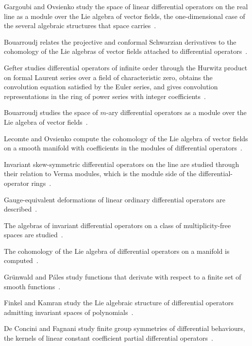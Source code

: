 Gargoubi and Ovsienko study the space of linear differential operators on the real line as a module over the Lie algebra of vector fields, the one-dimensional case of the several algebraic structures that space carries~\cite{WlSpaceOfLinearDifferentialOpera1996}.

Bouarroudj relates the projective and conformal Schwarzian derivatives to the cohomology of the Lie algebras of vector fields attached to differential operators~\cite{WlProjectiveAndConformalSchwarzi2006}.

Gefter studies differential operators of infinite order through the Hurwitz product on formal Laurent series over a field of characteristic zero, obtains the convolution equation satisfied by the Euler series, and gives convolution representations in the ring of power series with integer coefficients~\cite{WlDifferentialOperatorsOfInfinit2020}.

Bouarroudj studies the space of $m$-ary differential operators as a module over the Lie algebra of vector fields~\cite{WlTheSpaceOfMAryDifferentialOper2020}.

Lecomte and Ovsienko compute the cohomology of the Lie algebra of vector fields on a smooth manifold with coefficients in the modules of differential operators~\cite{WlCohomologyOfTheVectorFieldsLie2020}.

Invariant skew-symmetric differential operators on the line are studied through their relation to Verma modules, which is the module side of the differential-operator rings~\cite{WlInvariantSkewSymmetricDifferen2020}.

Gauge-equivalent deformations of linear ordinary differential operators are described~\cite{WlGaugeEquivalentDeformationsOfL2020}.

The algebras of invariant differential operators on a class of multiplicity-free spaces are studied~\cite{WlAlgebrasOfInvariantDifferentia2020}.

The cohomology of the Lie algebra of differential operators on a manifold is computed~\cite{WlCohomologyOfTheLieAlgebraOfDif2020}.

Gr\"unwald and P\'ales study functions that derivate with respect to a finite set of smooth functions~\cite{WlOnDerivationsWithRespectToFini2020}.

Finkel and Kamran study the Lie algebraic structure of differential operators admitting invariant spaces of polynomials~\cite{WlTheLieAlgebraicStructureOfDiff2020}.

De Concini and Fagnani study finite group symmetries of differential behaviours, the kernels of linear constant coefficient partial differential operators~\cite{WlSymmetriesOfDifferentialBehavi2020}.

